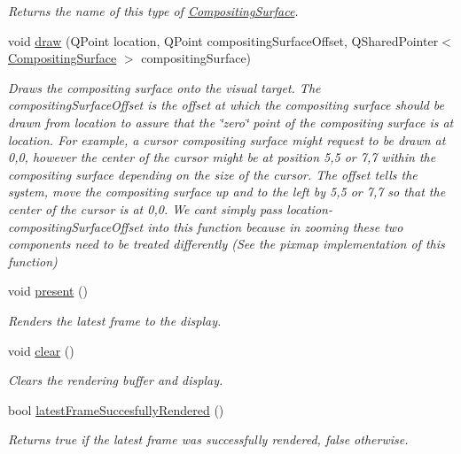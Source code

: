 \begin{DoxyCompactItemize}
\begin{DoxyCompactList}\small\item\em Returns the name of this type of \hyperlink{struct_picto_1_1_compositing_surface}{Compositing\-Surface}. \end{DoxyCompactList}\item 
void \hyperlink{struct_picto_1_1_pixmap_visual_target_a85cadece274f7f94bd7f36e7fe2f34b0}{draw} (Q\-Point location, Q\-Point compositing\-Surface\-Offset, Q\-Shared\-Pointer$<$ \hyperlink{struct_picto_1_1_compositing_surface}{Compositing\-Surface} $>$ compositing\-Surface)
\begin{DoxyCompactList}\small\item\em Draws the compositing surface onto the visual target. The compositing\-Surface\-Offset is the offset at which the compositing surface should be drawn from location to assure that the \char`\"{}zero\char`\"{} point of the compositing surface is at location. For example, a cursor compositing surface might request to be drawn at 0,0, however the center of the cursor might be at position 5,5 or 7,7 within the compositing surface depending on the size of the cursor. The offset tells the system, move the compositing surface up and to the left by 5,5 or 7,7 so that the center of the cursor is at 0,0. We cant simply pass location-\/compositing\-Surface\-Offset into this function because in zooming these two components need to be treated differently (See the pixmap implementation of this function) \end{DoxyCompactList}\item 
void \hyperlink{struct_picto_1_1_pixmap_visual_target_a2546a9881bd5ec96685d7e8c09e0f7a8}{present} ()
\begin{DoxyCompactList}\small\item\em Renders the latest frame to the display. \end{DoxyCompactList}\item 
void \hyperlink{struct_picto_1_1_pixmap_visual_target_a0f4e934a0efcc50c90718a24157ecd2f}{clear} ()
\begin{DoxyCompactList}\small\item\em Clears the rendering buffer and display. \end{DoxyCompactList}\item 
bool \hyperlink{struct_picto_1_1_pixmap_visual_target_a4f1dbd1319f35b1aa295b607b4066510}{latest\-Frame\-Succesfully\-Rendered} ()
\begin{DoxyCompactList}\small\item\em Returns true if the latest frame was successfully rendered, false otherwise. \end{DoxyCompactList}\item 

\end{DoxyCompactItemize}
